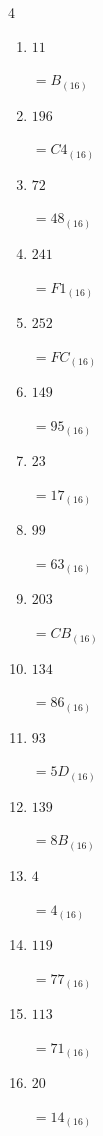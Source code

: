 \begin{multicols}{4}
\begin{enumerate}
        $=AF_{(16)}$

  \item $11$

        $=B_{(16)}$

  \item $196$

        $=C4_{(16)}$

  \item $72$

        $=48_{(16)}$

  \item $241$

        $=F1_{(16)}$

  \item $252$

        $=FC_{(16)}$

  \item $149$

        $=95_{(16)}$

  \item $23$

        $=17_{(16)}$

  \item $99$

        $=63_{(16)}$

  \item $203$

        $=CB_{(16)}$

  \item $134$

        $=86_{(16)}$

\columnbreak %

  \item $93$

        $=5D_{(16)}$

  \item $139$

        $=8B_{(16)}$

  \item $4$

        $=4_{(16)}$

  \item $119$

        $=77_{(16)}$

  \item $113$

        $=71_{(16)}$

  \item $20$

        $=14_{(16)}$


\end{enumerate}
\end{multicols}
